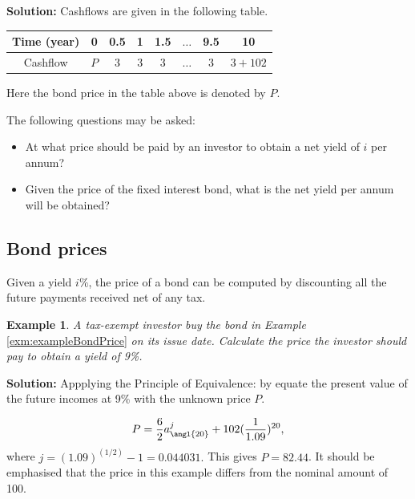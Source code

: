 \documentclass[
]{book}
\theoremstyle{definition}
\theoremstyle{definition}
\newtheorem{example}{Example}[chapter]
\theoremstyle{definition}
\theoremstyle{definition}
\theoremstyle{remark}
\begin{document}
\textbf{Solution:} Cashflows are given in the following table.

\begin{longtable}[]{@{}cccccccc@{}}
\toprule\noalign{}
Time (year) & 0 & 0.5 & 1 & 1.5 & \(\ldots\) & 9.5 & 10 \\
\midrule\noalign{}
\endhead
\bottomrule\noalign{}
\endlastfoot
Cashflow & \(P\) & 3 & 3 & 3 & \(\ldots\) & \(3\) & \(3 + 102\) \\
\end{longtable}

Here the bond price in the table above is denoted by \(P\).

The following questions may be asked:

\begin{itemize}
\item
  At what price should be paid by an investor to obtain a net yield of
  \(i\) per annum?
\item
  Given the price of the fixed interest bond, what is the net yield
  per annum will be obtained?
\end{itemize}

\subsection{Bond prices}\label{bond-prices}

Given a yield \(i\%\), the price of a bond can be computed by discounting
all the future payments received net of any tax.

\begin{example}
\protect\hypertarget{exm:exampleBondPrice2}{}\label{exm:exampleBondPrice2}\emph{A tax-exempt investor buy the bond in Example}
\ref{exm:exampleBondPrice} \emph{on its issue date. Calculate the price the
investor should pay to obtain a yield of 9\%.}
\end{example}

\textbf{Solution:} Appplying the Principle of Equivalence: by equate the
present value of the future incomes at 9\% with the unknown price \(P\).

\[P = \frac{6}{2} a^j_{\angl{20}} + 102 (\frac{1}{1.09})^{20},\] where
\(j = (1.09)^{(1/2)} - 1 = 0.044031.\) This gives \(P = 82.44\). It should
be emphasised that the price in this example differs from the nominal
amount of 100.
\end{document}
